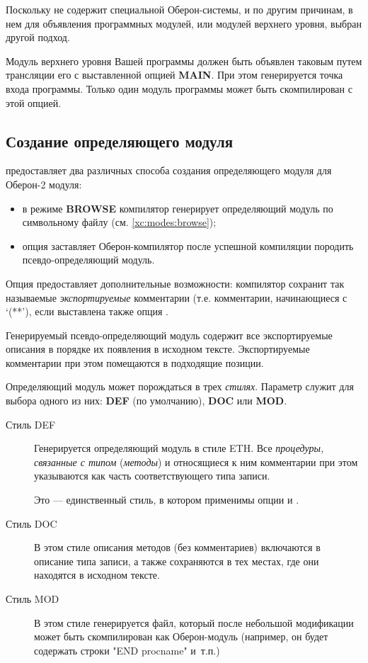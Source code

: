 Поскольку \xds{} не содержит специальной Оберон-системы, и по
другим причинам, в нем для объявления программных модулей, 
или модулей верхнего уровня, выбран другой подход.

Модуль верхнего уровня Вашей программы должен быть объявлен таковым
путем трансляции его с выставленной опцией 
{\bf MAIN}. При этом генерируется точка входа программы.
Только один модуль программы может быть скомпилирован с этой опцией.

\subsection{Создание определяющего модуля}\label{o2:env:makedef}

\xds{} предоставляет два различных способа создания определяющего
модуля для Оберон-2 модуля:
\begin{itemize}
\item
в режиме {\bf BROWSE} компилятор генерирует определяющий модуль
по символьному файлу (см. \ref{xc:modes:browse});
\item
опция  заставляет Оберон-компилятор после
успешной компиляции породить псевдо-определяющий модуль.
\end{itemize}

Опция  предоставляет дополнительные возможности:
компилятор сохранит так называемые 
{\em экспортируемые} комментарии (т.е. комментарии, начинающиеся с
`(**'), если выставлена также опция
.

Генерируемый псевдо-определяющий модуль содержит все экспортируемые
описания в порядке их появления в исходном тексте. Экспортируемые 
комментарии при этом помещаются в подходящие позиции.

Определяющий модуль может порождаться в трех
{\em стилях}.
Параметр  служит для выбора одного из них:
{\bf DEF} (по умолчанию), {\bf DOC} или {\bf MOD}.

\begin{description}
\item[Стиль DEF] \mbox{}

Генерируется определяющий модуль в стиле ETH. Все
{\em процедуры, связанные с типом} ({\em методы}) и относящиеся 
к ним комментарии при этом указываются как часть соответствующего 
типа записи.

Это --- единственный стиль, в котором применимы опции 
 и .

\item[Стиль DOC] \mbox{}

В этом стиле описания методов (без комментариев) включаются в описание
типа записи, а также сохраняются в тех местах, где они находятся в
исходном тексте.

\item[Стиль MOD] \mbox{}

В этом стиле генерируется файл, который после небольшой модификации
может быть скомпилирован как Оберон-модуль (например, он будет содержать
строки "END procname" и~т.п.)
\end{description}

